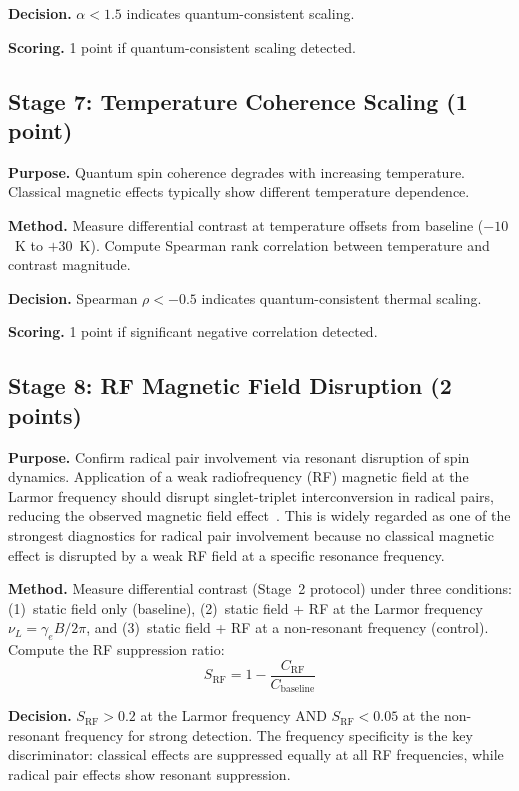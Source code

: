 \documentclass[preprint,amsmath,amssymb]{revtex4-2}
\begin{document}
\textbf{Decision.} $\alpha < 1.5$ indicates quantum-consistent scaling.

\textbf{Scoring.} 1 point if quantum-consistent scaling detected.

\subsection{Stage 7: Temperature Coherence Scaling (1 point)}

\textbf{Purpose.} Quantum spin coherence degrades with increasing temperature. Classical magnetic effects typically show different temperature dependence.

\textbf{Method.} Measure differential contrast at temperature offsets from baseline ($-10$~K to $+30$~K). Compute Spearman rank correlation between temperature and contrast magnitude.

\textbf{Decision.} Spearman $\rho < -0.5$ indicates quantum-consistent thermal scaling.

\textbf{Scoring.} 1 point if significant negative correlation detected.

\subsection{Stage 8: RF Magnetic Field Disruption (2 points)}

\textbf{Purpose.} Confirm radical pair involvement via resonant disruption of spin dynamics. Application of a weak radiofrequency (RF) magnetic field at the Larmor frequency should disrupt singlet-triplet interconversion in radical pairs, reducing the observed magnetic field effect~\cite{hore2016}. This is widely regarded as one of the strongest diagnostics for radical pair involvement because no classical magnetic effect is disrupted by a weak RF field at a specific resonance frequency.

\textbf{Method.} Measure differential contrast (Stage~2 protocol) under three conditions: (1)~static field only (baseline), (2)~static field + RF at the Larmor frequency $\nu_L = \gamma_e B / 2\pi$, and (3)~static field + RF at a non-resonant frequency (control). Compute the RF suppression ratio:
\begin{equation}
S_\text{RF} = 1 - \frac{C_\text{RF}}{C_\text{baseline}}
\end{equation}

\textbf{Decision.} $S_\text{RF} > 0.2$ at the Larmor frequency AND $S_\text{RF} < 0.05$ at the non-resonant frequency for strong detection. The frequency specificity is the key discriminator: classical effects are suppressed equally at all RF frequencies, while radical pair effects show resonant suppression.
\end{document}
